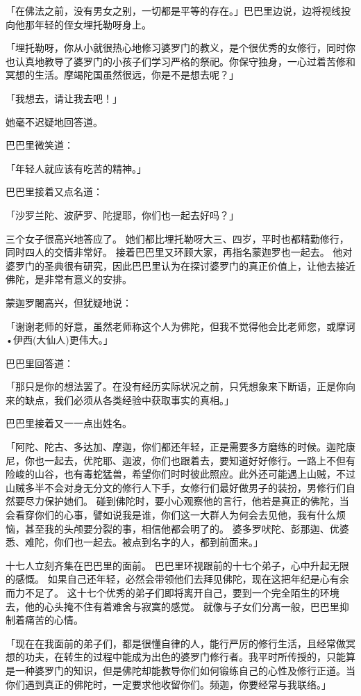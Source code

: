 \documentclass[twoside,openany]{book}
\begin{document}
「在佛法之前，没有男女之别，一切都是平等的存在。」巴巴里边说，边将视线投向他那年轻的侄女埋托勒呀身上。

「埋托勒呀，你从小就很热心地修习婆罗门的教义，是个很优秀的女修行，同时你也认真地教导了婆罗门的小孩子们学习严格的祭祀。你保守独身，一心过着苦修和冥想的生活。摩竭陀国虽然很远，你是不是想去呢？」

「我想去，请让我去吧！」

她毫不迟疑地回答道。

巴巴里微笑道：

「年轻人就应该有吃苦的精神。」

巴巴里接着又点名道：

「沙罗兰陀、波萨罗、陀提耶，你们也一起去好吗？」

三个女子很高兴地答应了。
她们都比埋托勒呀大三、四岁，平时也都精勤修行，同时四人的交情非常好。
接着巴巴里又环顾大家，再指名蒙迦罗也一起去。
他对婆罗门的圣典很有研究，因此巴巴里认为在探讨婆罗门的真正价值上，让他去接近佛陀，是非常有意义的安排。

蒙迦罗闍高兴，但犹疑地说：

「谢谢老师的好意，虽然老师称这个人为佛陀，但我不觉得他会比老师您，或摩诃•伊西(大仙人)更伟大。」

巴巴里回答道：

「那只是你的想法罢了。在没有经历实际状况之前，只凭想象来下断语，正是你向来的缺点，我们必须从各类经验中获取事实的真相。」

巴巴里接着又一一点出姓名。

「阿陀、陀古、多达加、摩迦，你们都还年轻，正是需要多方磨练的时候。迦陀康尼，你也一起去，优陀耶、迦波，你们也跟着去，要知道好好修行。一路上不但有险峻的山谷，也有毒蛇猛兽，希望你们时时彼此照应。此外还可能遇上山贼，不过山贼多半不会对身无分文的修行人下手，女修行们最好做男子的装扮，男修行们自然要尽力保护她们。
碰到佛陀时，要小心观察他的言行，他若是真正的佛陀，当会看穿你们的心事，譬如说我是谁，你们这一大群人为何会去见他，我有什么烦恼，甚至我的头颅要分裂的事，相信他都会明了的。
婆多罗吠陀、彭那迦、优婆悉、难陀，你们也一起去。被点到名字的人，都到前面来。」

十七人立刻齐集在巴巴里的面前。
巴巴里环视跟前的十七个弟子，心中升起无限的感慨。
如果自己还年轻，必然会带领他们去拜见佛陀，现在这把年纪是心有余而力不足了。
这十七个优秀的弟子们即将离开自己，要到一个完全陌生的环境去，他的心头掩不住有着难舍与寂寞的感觉。
就像与子女们分离一般，巴巴里抑制着痛苦的心情。

「现在在我面前的弟子们，都是很懂自律的人，能行严厉的修行生活，且经常做冥想的功夫，在转生的过程中能成为出色的婆罗门修行者。我平时所传授的，只能算是一种婆罗门的知识，但是佛陀却能教导你们如何锻练自己的心性及修行正道。当你们遇到真正的佛陀时，一定要求他收留你们。频迦，你要经常与我联络。」
\end{document}
